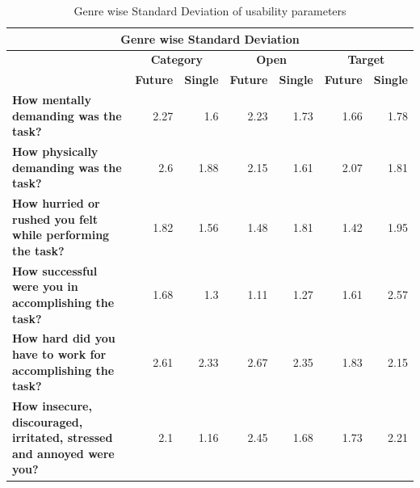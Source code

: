 \documentclass[english]{tktltiki}
\begin{document}
\iffalse


\begin{table}
	\small
	\begin{center}
    \begin{tabular}{|p{6cm}|r|r|r|r|r|r|}
        \hline
        \multicolumn{7}{|c|}{\textbf{Genre wise Standard Deviation}} \\
        \hline
        
        \multicolumn{1}{|c|}{} & \multicolumn{2}{|c|}{\textbf{Category}} & \multicolumn{2}{|c|}{\textbf{Open}} & \multicolumn{2}{|c|}{\textbf{Target}} \\
        \hline
        
        \multicolumn{1}{|c|}{} & \multicolumn{1}{|c|}{\textbf{Future}} & \multicolumn{1}{|c|}{\textbf{Single}} & \multicolumn{1}{|c|}{\textbf{Future}} & \multicolumn{1}{|c|}{\textbf{Single}} & \multicolumn{1}{|c|}{\textbf{Future}} & \multicolumn{1}{|c|}{\textbf{Single}} \\
        \hline
        
        \textbf{How mentally demanding was the task?} & 2.27 & 1.6 & 2.23 & 1.73 & 1.66 & 1.78 \\
        \hline
        
        \textbf{How physically demanding was the task?} & 2.6 & 1.88 & 2.15 & 1.61 & 2.07 & 1.81 \\
        \hline
        
        \textbf{How hurried or rushed you felt while performing the task?} & 1.82 & 1.56 & 1.48 & 1.81 & 1.42 & 1.95 \\
        \hline
        
        \textbf{How successful were you in accomplishing the task?} & 1.68 & 1.3 & 1.11 & 1.27 & 1.61 & 2.57 \\
        \hline
        
        \textbf{How hard did you have to work for accomplishing the task?} & 2.61 & 2.33 & 2.67 & 2.35 & 1.83 & 2.15 \\
        \hline
        
        \textbf{How insecure, discouraged, irritated, stressed and annoyed were you?} & 2.1 & 1.16 & 2.45 & 1.68 & 1.73 & 2.21 \\
        \hline
        
    \end{tabular}
	\end{center}
	\caption{Genre wise Standard Deviation of usability parameters}
    \label{table:use_std_genre}
\end{table}
\end{document}
